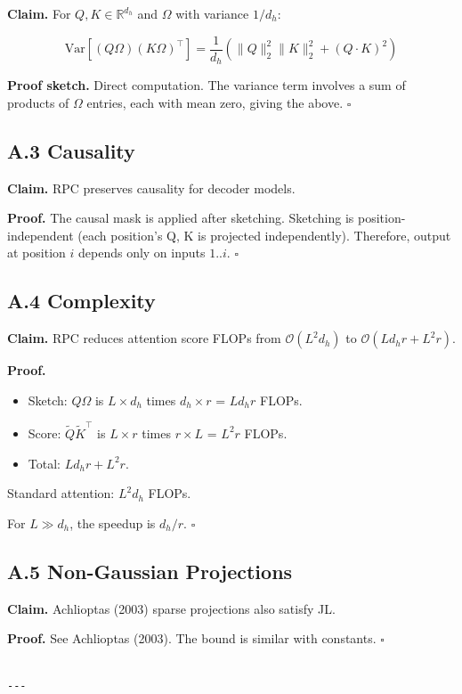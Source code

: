 \textbf{Claim.} For $Q, K \in \mathbb{R}^{d_h}$ and $\Omega$ with variance $1/d_h$:

\[
\text{Var}[(Q\Omega)(K\Omega)^\top] = \frac{1}{d_h} \left(\|Q\|_2^2 \|K\|_2^2 + (Q \cdot K)^2\right)
\tag{A.2}
\]

\textbf{Proof sketch.} Direct computation. The variance term involves a sum of products of $\Omega$ entries, each with mean zero, giving the above. $\square$

\subsection{A.3 Causality}

\textbf{Claim.} RPC preserves causality for decoder models.

\textbf{Proof.} The causal mask is applied after sketching. Sketching is 
position-independent (each position's Q, K is projected independently). 
Therefore, output at position $i$ depends only on inputs $1..i$. $\square$

\subsection{A.4 Complexity}

\textbf{Claim.} RPC reduces attention score FLOPs from $\mathcal{O}(L^2 d_h)$ 
to $\mathcal{O}(L d_h r + L^2 r)$.

\textbf{Proof.}
\begin{itemize}
\item Sketch: $Q \Omega$ is $L \times d_h$ times $d_h \times r$ = $L d_h r$ FLOPs.
\item Score: $\tilde{Q} \tilde{K}^\top$ is $L \times r$ times $r \times L$ = $L^2 r$ FLOPs.
\item Total: $L d_h r + L^2 r$.

\end{itemize}
Standard attention: $L^2 d_h$ FLOPs.

For $L \gg d_h$, the speedup is $d_h / r$. $\square$

\subsection{A.5 Non-Gaussian Projections}

\textbf{Claim.} Achlioptas (2003) sparse projections also satisfy JL.

\textbf{Proof.} See Achlioptas (2003). The bound is similar with constants. $\square$
\begin{lstlisting}

---
\end{lstlisting}